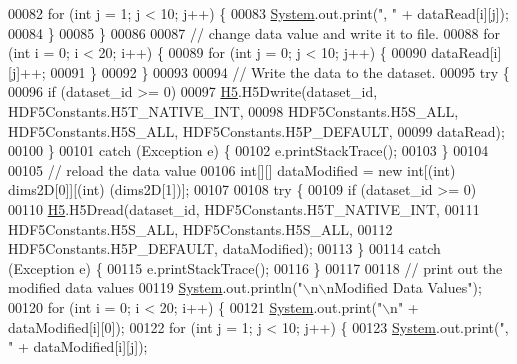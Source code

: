 \begin{DoxyCode}
00082             \textcolor{keywordflow}{for} (\textcolor{keywordtype}{int} j = 1; j < 10; j++) \{
00083                 \hyperlink{namespace_system}{System}.out.print(\textcolor{stringliteral}{", "} + dataRead[i][j]);
00084             \}
00085         \}
00086 
00087         \textcolor{comment}{// change data value and write it to file.}
00088         \textcolor{keywordflow}{for} (\textcolor{keywordtype}{int} i = 0; i < 20; i++) \{
00089             \textcolor{keywordflow}{for} (\textcolor{keywordtype}{int} j = 0; j < 10; j++) \{
00090                 dataRead[i][j]++;
00091             \}
00092         \}
00093 
00094         \textcolor{comment}{// Write the data to the dataset.}
00095         \textcolor{keywordflow}{try} \{
00096             \textcolor{keywordflow}{if} (dataset\_id >= 0)
00097                 \hyperlink{namespace_h5}{H5}.H5Dwrite(dataset\_id, HDF5Constants.H5T\_NATIVE\_INT,
00098                         HDF5Constants.H5S\_ALL, HDF5Constants.H5S\_ALL, HDF5Constants.H5P\_DEFAULT,
00099                         dataRead);
00100         \}
00101         \textcolor{keywordflow}{catch} (Exception e) \{
00102             e.printStackTrace();
00103         \}
00104 
00105         \textcolor{comment}{// reload the data value}
00106         \textcolor{keywordtype}{int}[][] dataModified = \textcolor{keyword}{new} \textcolor{keywordtype}{int}[(int) dims2D[0]][(\textcolor{keywordtype}{int}) (dims2D[1])];
00107 
00108         \textcolor{keywordflow}{try} \{
00109             \textcolor{keywordflow}{if} (dataset\_id >= 0)
00110                 \hyperlink{namespace_h5}{H5}.H5Dread(dataset\_id, HDF5Constants.H5T\_NATIVE\_INT,
00111                         HDF5Constants.H5S\_ALL, HDF5Constants.H5S\_ALL,
00112                         HDF5Constants.H5P\_DEFAULT, dataModified);
00113         \}
00114         \textcolor{keywordflow}{catch} (Exception e) \{
00115             e.printStackTrace();
00116         \}
00117 
00118         \textcolor{comment}{// print out the modified data values}
00119         \hyperlink{namespace_system}{System}.out.println(\textcolor{stringliteral}{"\(\backslash\)n\(\backslash\)nModified Data Values"});
00120         \textcolor{keywordflow}{for} (\textcolor{keywordtype}{int} i = 0; i < 20; i++) \{
00121             \hyperlink{namespace_system}{System}.out.print(\textcolor{stringliteral}{"\(\backslash\)n"} + dataModified[i][0]);
00122             \textcolor{keywordflow}{for} (\textcolor{keywordtype}{int} j = 1; j < 10; j++) \{
00123                 \hyperlink{namespace_system}{System}.out.print(\textcolor{stringliteral}{", "} + dataModified[i][j]);

\end{DoxyCode}

